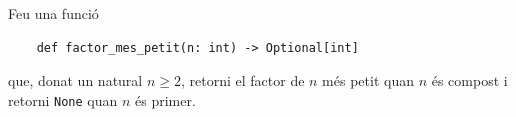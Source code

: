 

\Statement

Feu una funció

\lstset{language=Python}
\begin{lstlisting}
    def factor_mes_petit(n: int) -> Optional[int]
\end{lstlisting}

que, donat un natural $n\ge2$, retorni el factor de $n$ més petit quan $n$ és compost i 
retorni \texttt{None} quan $n$ és primer.

